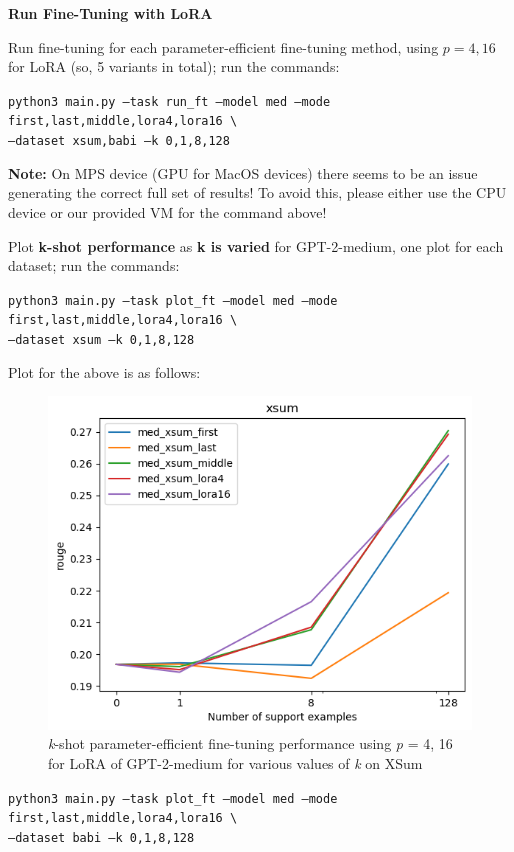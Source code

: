 \item {} {\bf Run Fine-Tuning with LoRA}

Run fine-tuning for each parameter-efficient fine-tuning method, using $p=4,16$ for LoRA (so, 5 variants in total); run the commands:

{\small \texttt{python3 main.py --task run\_ft --model med --mode first,last,middle,lora4,lora16 \textbackslash \\
\phantom{asdf}--dataset xsum,babi --k 0,1,8,128}}

\textbf{Note:} On MPS device (GPU for MacOS devices) there seems to be an issue generating the correct full set of results! To avoid this, please either use the CPU device or our provided VM for the command above!

Plot \textbf{k-shot performance} as \textbf{k is varied} for GPT-2-medium, one plot for each dataset; run the commands:

{\small \texttt{python3 main.py --task plot\_ft --model med --mode first,last,middle,lora4,lora16 \textbackslash \\
\phantom{asdf}--dataset xsum --k 0,1,8,128}}

Plot for the above is as follows:
\begin{figure}[H]
    \centering
    \includegraphics[width=0.75\linewidth]{./figures/q3_xsum_plot}
    \caption{\textit{k}-shot parameter-efficient fine-tuning performance using \textit{p} = 4, 16 for LoRA of GPT-2-medium for various values of \textit{k} on XSum}
\end{figure}

{\small \texttt{python3 main.py --task plot\_ft --model med --mode first,last,middle,lora4,lora16 \textbackslash \\
\phantom{asdf}--dataset babi --k 0,1,8,128}}

